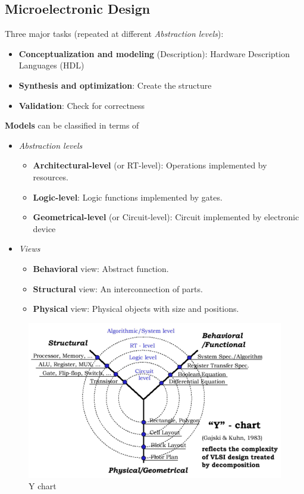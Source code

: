 \subsection{Microelectronic Design}
Three major tasks (repeated at different \textit{Abstraction levels}):
\begin{itemize}
\item \textbf{Conceptualization and modeling} (Description): Hardware Description Languages (HDL)
\item \textbf{Synthesis and optimization}: Create the structure
\item \textbf{Validation}: Check for correctness
\end{itemize}
\textbf{Models} can be classified in terms of
\begin{itemize}
\item \textit{Abstraction levels}
\begin{itemize}
\item \textbf{Architectural-level} (or RT-level): Operations implemented by
resources.
\item \textbf{Logic-level}: Logic functions implemented by gates.
\item \textbf{Geometrical-level} (or Circuit-level): Circuit implemented by electronic device
\end{itemize}
\item \textit{Views}
\begin{itemize}
\item \textbf{Behavioral} view: Abstract function.
\item \textbf{Structural} view: An interconnection of parts.
\item \textbf{Physical} view: Physical objects with size and positions.
\end{itemize}
\end{itemize}
\begin{figure}[H]
	\centering
	\includegraphics[height=90 mm]{./Cap1/Images/Image02.png}
	\caption[Optional caption]{Y chart}
	\label{fig:Ychart}
\end{figure}
